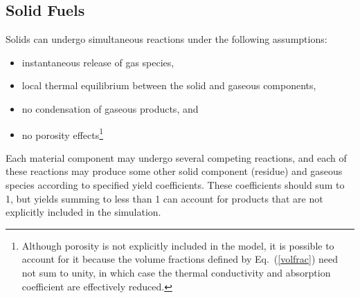 \subsection{Solid Fuels}

Solids can undergo simultaneous reactions under the following assumptions:
\begin{itemize}
\setlength{\itemsep}{0.0in}
\item instantaneous release of gas species,
\item local thermal equilibrium between the solid and gaseous components,
\item no condensation of gaseous products, and
\item no porosity effects\footnote{Although porosity is not explicitly included in the model, it is possible to account for it because the volume fractions defined by Eq.~(\ref{volfrac}) need not sum to unity, in which case the thermal conductivity and absorption coefficient are effectively reduced.}
\end{itemize}
Each material component may undergo several competing reactions, and each of these reactions may produce some other solid component (residue) and gaseous species according to specified yield coefficients.  These coefficients should sum to 1, but yields summing to less than 1 can account for products that are not explicitly included in the simulation.

